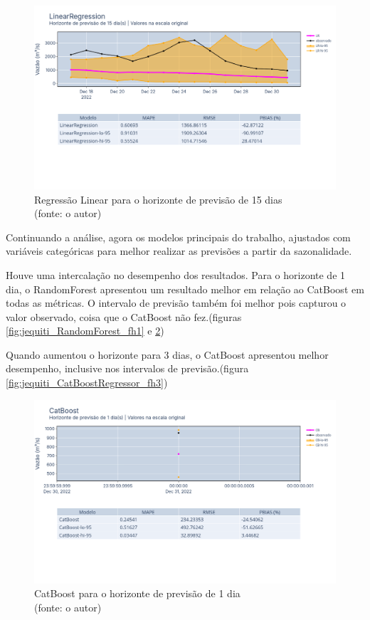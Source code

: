 \begin{figure}[!h]
	\centering
	\includegraphics[scale=0.33]{Figuras/jequiti/resultados/LinearRegression_fh15.png}
	\caption{Regressão Linear para o horizonte de previsão de 15 dias\\(fonte: o autor)}
	\label{fig:jequiti_LinearRegression_fh15}
\end{figure}

Continuando a análise, agora os modelos principais do trabalho, ajustados com variáveis categóricas para melhor realizar as previsões a partir da sazonalidade.

Houve uma intercalação no desempenho dos resultados. Para o horizonte de 1 dia, o RandomForest apresentou um resultado melhor em relação ao CatBoost em todas as métricas. O intervalo de previsão também foi melhor pois capturou o valor observado, coisa que o CatBoost não fez.(figuras \ref{fig:jequiti_RandomForest_fh1} e \ref{fig:jequiti_CatBoostRegressor_fh1})

Quando aumentou o horizonte para 3 dias, o CatBoost apresentou melhor desempenho, inclusive nos intervalos de previsão.(figura \ref{fig:jequiti_CatBoostRegressor_fh3})

\begin{figure}[!h]
	\centering
	\includegraphics[scale=0.33]{Figuras/jequiti/resultados/CatBoost_fh1.png}
	\caption{CatBoost para o horizonte de previsão de 1 dia\\(fonte: o autor)}
	\label{fig:jequiti_CatBoostRegressor_fh1}
\end{figure}


